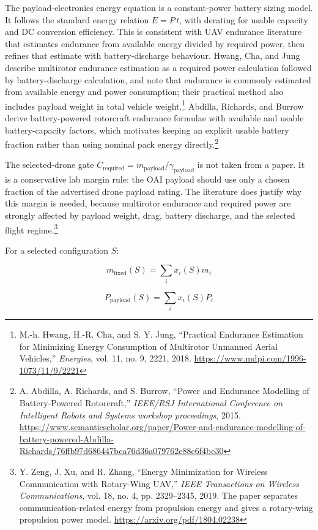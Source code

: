 \documentclass[11pt]{article}
\begin{document}
The payload-electronics energy equation is a constant-power battery sizing
model. It follows the standard energy relation $E=P\,t$, with derating for
usable capacity and DC conversion efficiency. This is consistent with UAV
endurance literature that estimates endurance from available energy divided by
required power, then refines that estimate with battery-discharge behaviour.
Hwang, Cha, and Jung describe multirotor endurance estimation as a required
power calculation followed by battery-discharge calculation, and note that
endurance is commonly estimated from available energy and power consumption;
their practical method also includes payload weight in total vehicle
weight.\footnote{M.-h. Hwang, H.-R. Cha, and S. Y. Jung, ``Practical Endurance
Estimation for Minimizing Energy Consumption of Multirotor Unmanned Aerial
Vehicles,'' \emph{Energies}, vol. 11, no. 9, 2221, 2018.
\url{https://www.mdpi.com/1996-1073/11/9/2221}} Abdilla, Richards, and
Burrow derive battery-powered rotorcraft endurance formulae with available and
usable battery-capacity factors, which motivates keeping an explicit usable
battery fraction rather than using nominal pack energy directly.\footnote{A.
Abdilla, A. Richards, and S. Burrow, ``Power and Endurance Modelling of
Battery-Powered Rotorcraft,'' \emph{IEEE/RSJ International Conference on
Intelligent Robots and Systems workshop proceedings}, 2015.
\url{https://www.semanticscholar.org/paper/Power-and-endurance-modelling-of-battery-powered-Abdilla-Richards/76ffb97d686447bca76d36a079762e88c6f4bc30}}

The selected-drone gate
$C_\mathrm{required}=m_\mathrm{payload}/\gamma_\mathrm{payload}$ is not taken
from a paper. It is a conservative lab margin rule: the OAI payload should use
only a chosen fraction of the advertised drone payload rating. The literature
does justify why this margin is needed, because multirotor endurance and
required power are strongly affected by payload weight, drag, battery discharge,
and the selected flight regime.\footnote{Y. Zeng, J. Xu, and R. Zhang,
``Energy Minimization for Wireless Communication with Rotary-Wing UAV,''
\emph{IEEE Transactions on Wireless Communications}, vol. 18, no. 4, pp.
2329--2345, 2019. The paper separates communication-related energy from
propulsion energy and gives a rotary-wing propulsion power model.
\url{https://arxiv.org/pdf/1804.02238}}

For a selected configuration $S$:

\[
  m_\mathrm{fixed}(S)=\sum_i x_i(S)m_i
\]

\[
  P_\mathrm{payload}(S)=\sum_i x_i(S)P_i
\]
\end{document}
